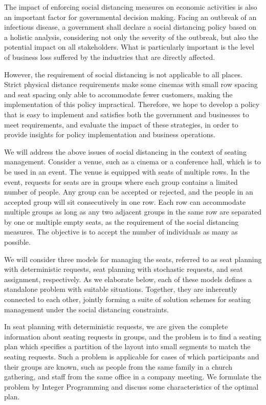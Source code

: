 The impact of enforcing social distancing measures on economic activities is also an important factor for governmental decision making. Facing an outbreak of an infectious disease, a government shall declare a social distancing policy based on a holistic analysis, considering not only the severity of the outbreak, but also the potential impact on all stakeholders. What is particularly important is the level of business loss suffered by the industries that are directly affected.  

However, the requirement of social distancing is not applicable to all places. Strict physical distance requirements make some cinemas with small row spacing and seat spacing only able to accommodate fewer customers, making the implementation of this policy impractical. Therefore, we hope to develop a policy that is easy to implement and satisfies both the government and businesses to meet requirements, and evaluate the impact of these strategies, in order to provide insights for policy implementation and business operations.


We will address the above issues of social distancing in the context of seating management. Consider a venue, such as a cinema or a conference hall, which is to be used in an event. The venue is equipped with seats of multiple rows. In the event, requests for seats are in groups where each group contains a limited number of people. Any group can be accepted or rejected, and the people in an accepted group  will sit consecutively in one row. Each row can accommodate multiple groups as long as any two adjacent groups in the same row are separated by one or multiple empty seats, as the requirement of the social distancing measures. The objective is to accept the number of individuals as many as possible.

We will consider three models for managing the seats, referred to as seat planning with deterministic requests, seat planning with stochastic requests, and seat assignment, respectively. As we elaborate below, each of these models defines a standalone problem with suitable situations. Together, they are inherently connected to each other, jointly forming a suite of solution schemes for seating management under the social distancing constraints.

In seat planning with deterministic requests, we are given the complete information about seating requests in groups, and the problem is to find a seating plan which specifies a partition of the layout into small segments to match the seating requests. Such a problem is applicable for cases of which participants and their groups are known, such as people from the same family in a church gathering, and staff from the same office in a company meeting.
We formulate the problem by Integer Programming and discuss some characteristics  of the optimal plan.
 
